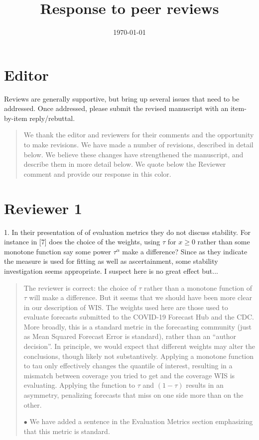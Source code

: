 \documentclass[11pt]{article}
\title{Response to peer reviews}
\author{}
\date{\today}
\newenvironment{resp}{\begin{quote}\color{cobalt}}{\end{quote}}
\begin{document}
\maketitle


\section*{Editor}


  Reviews are generally supportive, but bring up several issues that need to be
  addressed. Once addressed, please submit the revised manuscript with an
  item-by-item reply/rebuttal.  


\begin{resp}
  We thank the editor and reviewers for their comments and the opportunity to make
  revisions. We have made a number of revisions, described in detail below.
  We believe these changes have strengthened the manuscript, and describe them in
  more detail below.
  We quote below the Reviewer comment and provide our response in this color.
\end{resp}


\section*{Reviewer 1}



  1. In their presentation of of evaluation metrics they do not discuss
  stability. For instance in [7] does the choice of the weights, using $\tau$ for
  $x\geq 0$ rather than some monotone function say some power $\tau^\alpha$ make a
  difference? Since as they indicate the measure is used for fitting as well as
  ascertainment, some stability investigation seems appropriate. I suspect here
  is no great effect but...


\begin{resp}
  The reviewer is correct: the choice of $\tau$ rather than a monotone function of
  $\tau$ will make a difference. But it seems that we should have been more clear
  in our description of WIS. The weights used here are those used to evaluate
  forecasts submitted to the COVID-19 Forecast Hub and the CDC. More broadly,
  this is a standard metric in the forecasting community (just as Mean Squared
  Forecast Error is standard), rather than an ``author decision''.  In principle,
  we would expect that different weights may alter the conclusions, though
  likely not substantively. Applying a monotone function to tau only effectively
  changes the quantile of interest, resulting in a mismatch between coverage you
  tried to get and the coverage WIS is evaluating. Applying the function to $\tau$
  and $(1-\tau)$ results in an asymmetry, penalizing forecasts that miss on one
  side more than on the other.

  $\bullet$ We have added a sentence in the Evaluation Metrics section emphasizing that
  this metric is standard.
\end{resp}
\end{document}
